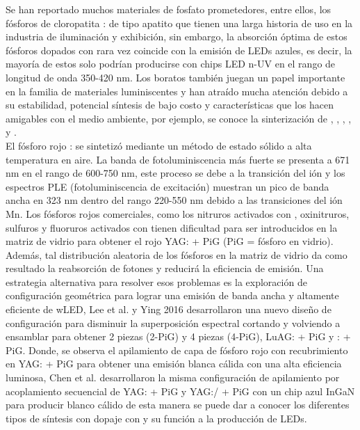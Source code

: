 Se han reportado muchos materiales de fosfato prometedores, entre ellos, los
fósforos de cloropatita : de tipo
apatito que tienen una larga historia de uso en la industria de iluminación y
exhibición, sin embargo, la absorción óptima de estos fósforos dopados con
 rara vez coincide con la emisión de LEDs azules, es decir, la mayoría de
estos solo podrían producirse con chips LED n-UV en el rango de longitud de
onda 350-420 nm. Los boratos también juegan un papel importante en la familia
de materiales luminiscentes y han atraído mucha atención debido a su
estabilidad, potencial síntesis de bajo costo y características que los hacen
amigables con el medio ambiente, por ejemplo, se conoce la sinterización de
, , , ,
 y \cite{Wu2018}.\\

El fósforo rojo : se sintetizó mediante un método de
estado sólido a alta temperatura en aire. La banda de fotoluminiscencia
más fuerte se presenta a 671 nm en el rango de 600-750 nm, este proceso se debe
a la transición  del ión  y los espectros PLE
(fotoluminiscencia de excitación) muestran un pico de banda ancha en 323 nm dentro
del rango 220-550 nm debido a las transiciones  del ión
Mn\cite{Cao2015}. Los fósforos rojos comerciales, como los nitruros activados
con , oxinitruros, sulfuros y fluoruros activados con 
tienen dificultad para ser introducidos en la matriz de vidrio para obtener el
rojo YAG: + PiG (PiG = fósforo en vidrio). Además, tal distribución aleatoria de los
fósforos en la matriz de vidrio da como resultado la reabsorción de fotones y
reducirá la eficiencia de emisión\cite{Chen2016}. Una estrategia alternativa
para resolver esos problemas es la exploración de configuración geométrica para
lograr una emisión de banda ancha y altamente eficiente de wLED, Lee et al. y Ying 2016
desarrollaron una nuevo diseño de configuración para disminuir la superposición
espectral cortando y volviendo a ensamblar para obtener 2 piezas (2-PiG) y 
4 piezas (4-PiG), LuAG: + PiG y : +
PiG. Donde, se observa el apilamiento de capa de fósforo rojo con recubrimiento
en YAG: + PiG para obtener una emisión blanca cálida 
con una alta eficiencia luminosa, Chen et al. desarrollaron la misma configuración de
apilamiento por acoplamiento secuencial de YAG: + PiG y
YAG:/ + PiG con un chip azul InGaN para producir blanco
cálido de esta manera se puede dar a conocer los diferentes tipos de síntesis
con dopaje con  y su función a la producción de
LEDs\cite{Lin2015,Xiang2016}.\\


